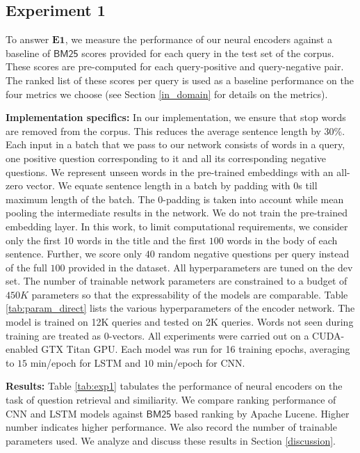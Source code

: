 \documentclass{sigkddExp}
\begin{document}
\subsection{Experiment 1}
To answer $\mathbf{E1}$, we measure the performance of our neural encoders against a baseline of $\mathsf{BM25}$ scores provided for each query in the test set of the corpus. These scores are pre-computed for each query-positive and query-negative pair. The ranked list of these scores per query is used as a baseline performance on the four metrics we choose (see Section \ref{in_domain} for details on the metrics).

\textbf{Implementation specifics:}
In our implementation, we ensure that stop words are removed from the corpus. This reduces the average sentence length by 30\%. Each input in a batch that we pass to our network consists of words in a query, one positive question corresponding to it and all its corresponding negative questions.  We represent unseen words in the pre-trained embeddings with an all-zero vector. We equate sentence length in a batch by padding with $0$s till maximum length of the batch. The 0-padding is taken into account while mean pooling the intermediate results in the network. We do not train the pre-trained embedding layer. In this work, to limit computational requirements, we consider only the first 10 words in the title and the first $100$ words in the body of each sentence. Further, we score only $40$ random negative questions per query instead of the full $100$ provided in the dataset. All hyperparameters are tuned on the dev set. The number of trainable network parameters are constrained to a budget of $450K$ parameters so that the expressability of the models are comparable. Table \ref{tab:param_direct} lists the various hyperparameters of the encoder network. The model is trained on 12K queries and tested on 2K queries. Words not seen during training are treated as 0-vectors. All experiments were carried out on a CUDA-enabled GTX Titan GPU. Each model was run for 16 training epochs, averaging to $15$ min/epoch for LSTM and $10$ min/epoch for CNN.

\textbf{Results:}
Table \ref{tab:exp1} tabulates the performance of neural encoders on the task of question retrieval and similiarity. We compare ranking performance of CNN and LSTM models against $\textsf{BM25}$ based ranking by Apache Lucene. Higher number indicates higher performance. We also record the number of trainable parameters used. We analyze and discuss these results in Section \ref{discussion}.
\end{document}
